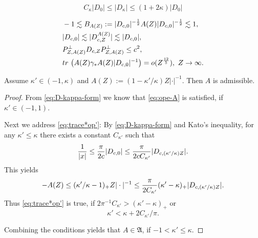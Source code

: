 \documentclass[10pt,a4paper]{amsart}
\def\gA{\mathfrak{A}}
\def\tr{{\rm tr \,}}
\begin{document}
\begin{equation}
  \label{eq:D-kappa-form}
  C_\kappa|D_0|\leq|D_\kappa|\leq(1+2\kappa) |D_0|
\end{equation}

   \begin{align}
    \label{eq:Birman}
     &-1\lesssim B_{A(Z)}:=|D_{c,0}|^{-\frac12}A(Z)|D_{c,0}|^{-\frac12}\lesssim1,\\
    \label{eq:ope-A}
    &|D_{c,0}|\lesssim |D_{c,Z}^{A(Z)}| \lesssim  |D_{c,0}|,\\
    \label{eq:trace*op'}
     &P_{Z,A(Z)}^\perp D_{c,Z}P_{Z,A(Z)}^\perp \leq c^2,\\
     & \label{eq:trace*op}
       \tr\left(A(Z)\gamma_*A(Z)|D_{c,0}|^{-1}\right)= o(Z^\frac{12}5),\ Z\to\infty.
  \end{align}

\begin{lemma}
  \label{noname}
  Assume $\kappa'\in(-1,\kappa)$ and
  $A(Z):= (1-\kappa'/\kappa) Z |\cdot|^{-1}$. Then $A$ is admissible.
\end{lemma}

\begin{proof}
  From \eqref{eq:D-kappa-form} we know that \eqref{eq:ope-A} is
  satisfied, if $\kappa'\in (-1,1)$.

  Next we address \eqref{eq:trace*op'}: By \eqref{eq:D-kappa-form} and
  Kato's inequality, for any $\kappa'\leq\kappa$ there exists a
  constant $C_{\kappa'}$ such that
\begin{equation}
    \frac{1}{|x|}\leq \frac{\pi}{2c}|D_{c,0}|\leq {\pi\over2c C_{\kappa'}}|D_{c,(\kappa'/\kappa) Z}|.
\end{equation}
This yields
\begin{equation}
  -A(Z)\leq (\kappa'/\kappa-1)_+Z|\cdot|^{-1}
  \leq {\pi\over2 C_{\kappa'}}(\kappa'-\kappa)_+|D_{c,(\kappa'/\kappa)Z}|.
\end{equation}
Thus \eqref{eq:trace*op'} is true, if
$ 2\pi^{-1} C_{\kappa'}>(\kappa'-\kappa)_+$ or
\begin{equation}
  \label{79} \kappa'<\kappa+ 2C_{\kappa'}/\pi.
\end{equation}

Combining the conditions yields that $ A \in\gA$, if $-1<\kappa'\leq\kappa$.
\end{proof}
\end{document}
